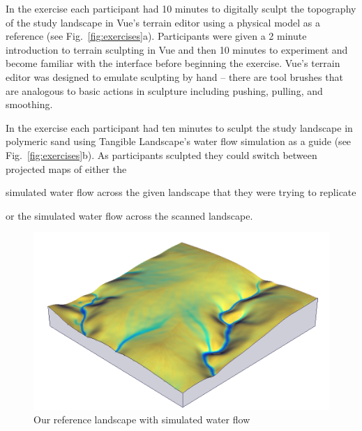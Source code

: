 \documentclass{isprs}
\begin{document}

In the  exercise 
each participant had 10 minutes to digitally sculpt the topography of the study landscape in Vue's terrain editor
using a physical model as a reference (see Fig.~\ref{fig:exercises}a).
Participants were given a 2 minute introduction to terrain sculpting in Vue and then 10 minutes to experiment and become familiar with the interface before beginning the exercise. Vue's terrain editor was designed to emulate sculpting by hand -- there are tool brushes that are analogous to basic actions in sculpture including pushing, pulling, and smoothing. 

In the  exercise each participant had ten minutes to  
sculpt the study landscape in polymeric sand
using Tangible Landscape's water flow simulation
as a guide (see Fig.~\ref{fig:exercises}b). 
%
As participants sculpted they could switch between projected maps of either the
\begin{enumerate*}[label=\alph*),font=\itshape]
\item simulated water flow across the given landscape that they were trying to replicate
\item or the simulated water flow across the scanned landscape.
\end{enumerate*}

\begin{figure}[ht!]
\begin{center}
\includegraphics[width=1.0\columnwidth]{figures/depth_3d.png}
\caption{Our reference landscape with simulated water flow}
\label{fig:study_area}
\end{center}
\end{figure}
\end{document}
